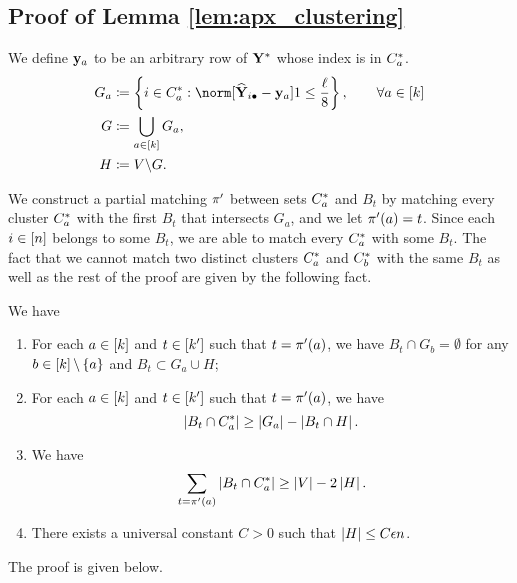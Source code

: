 \subsection{Proof of Lemma \ref{lem:apx_clustering}\label{sec:proof_apx_clustering}}

We define $\mathbf{y}_{a}$ to be an arbitrary row of $\mathbf{Y}^{*}$ whose index
is in $C_{a}^{*}$.
\begin{align*}
G_{a} & \coloneqq\left\{ i\in\clustset a:\norm[\Yhat_{i\bullet}-\y_{a}]1\leq\frac{\size}{8}\right\} ,\qquad\forall a\in\left[\numclust\right]\\
G & \coloneqq\bigcup_{a\in\left[\numclust\right]}G_{a},\\
H & \coloneqq\vertexset\backslash G.
\end{align*}

We construct a partial matching $\pi'$ between sets $C_{a}^{*}$
and $B_{t}$ by matching every cluster $C_{a}^{*}$ with the first
$B_{t}$ that intersects $G_{a}$, and we let $\pi'(a)=t$. Since
each $i\in\left[n\right]$ belongs to some $B_{t}$, we are able
to match every $C_{a}^{*}$ with some $B_{t}$. The fact that we
cannot match two distinct clusters $C_{a}^{*}$ and $C_{b}^{*}$
with the same $B_{t}$ as well as the rest of the proof are given
by the following fact.
\begin{fact}
\label{fact:apx_clustering} We have 
\begin{enumerate}
\item For each $a\in\left[k\right]$ and $t\in\left[k'\right]$
such that $t=\pi'(a)$, we have $B_{t}\cap G_{b}=\emptyset$ for
any $b\in\left[k\right]\backslash\left\{ a\right\} $ and
$B_{t}\subset G_{a}\cup H$;
\item For each $a\in\left[k\right]$ and $t\in\left[k'\right]$
such that $t=\pi'(a)$, we have 
\[
\left|B_{t}\cap C_{a}^{*}\right|\geq\left|G_{a}\right|-\left|B_{t}\cap H\right|.
\]
\item We have 
\[
\sum_{t=\pi'(a)}\left|B_{t}\cap C_{a}^{*}\right|\ge\left|V\right|-2\left|H\right|.
\]
\item There exists a universal constant $C>0$ such that $\left|H\right|\leq C\epsilon n$.
\end{enumerate}
\end{fact}
The proof is given below.


